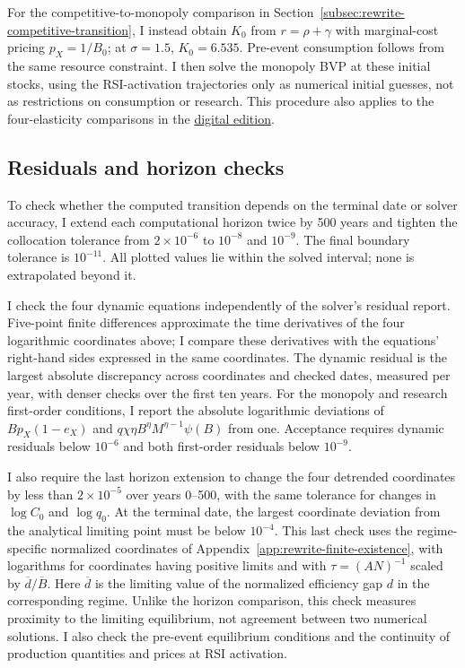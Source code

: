 For the competitive-to-monopoly comparison in
Section~\ref{subsec:rewrite-competitive-transition}, I instead obtain
$K_0$ from $r=\rho+\gamma$ with marginal-cost pricing $p_X=1/B_0$;
at $\sigma=1.5$, $K_0=6.535$. Pre-event consumption follows from the same
resource constraint. I then solve the monopoly BVP at these initial
stocks, using the RSI-activation trajectories only as numerical initial
guesses, not as restrictions on consumption or research. This procedure
also applies to the four-elasticity comparisons in the
\href{https://oliverpardo1979.github.io/ai-growth-and-labor/\#app:rewrite-competitive-transition}{digital edition}.

\subsection{Residuals and horizon checks}

To check whether the computed transition depends on the terminal date or
solver accuracy, I extend each computational horizon twice by 500 years and tighten the
collocation tolerance from $2\times10^{-6}$ to $10^{-8}$ and $10^{-9}$.
The final boundary tolerance is $10^{-11}$. All plotted values lie within
the solved interval; none is extrapolated beyond it.

I check the four dynamic equations independently of the solver's residual
report. Five-point finite differences approximate the time derivatives of
the four logarithmic coordinates above; I compare these derivatives with
the equations' right-hand sides expressed in the same coordinates.
The dynamic residual is the largest absolute discrepancy across
coordinates and checked dates, measured per year, with denser checks over
the first ten years. For the monopoly and research first-order conditions, I report the
absolute logarithmic deviations of $Bp_X(1-e_X)$ and
$q\chi\eta B^\eta M^{\eta-1}\psi(B)$ from one.
Acceptance requires dynamic residuals below $10^{-6}$ and both
first-order residuals below $10^{-9}$.

I also require the last horizon extension to change the four detrended
coordinates by less than $2\times10^{-5}$ over years 0--500, with the same
tolerance for changes in $\log C_0$ and $\log q_0$.
At the terminal date, the largest coordinate deviation from the
analytical limiting point must be below $10^{-4}$. This last check uses
the regime-specific normalized coordinates of
Appendix~\ref{app:rewrite-finite-existence}, with logarithms for coordinates
having positive limits and with $\tau=(AN)^{-1}$ scaled by
$\overline d/\overline B$. Here $\overline d$ is the limiting value of the
normalized efficiency gap $d$ in the corresponding regime. Unlike the
horizon comparison, this check measures proximity to the limiting
equilibrium, not agreement between two numerical solutions.
I also check the pre-event equilibrium conditions and the continuity of
production quantities and prices at RSI activation.

